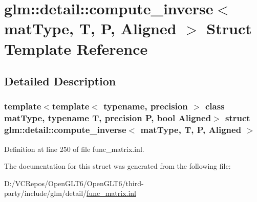 \hypertarget{structglm_1_1detail_1_1compute__inverse}{}\section{glm\+::detail\+::compute\+\_\+inverse$<$ mat\+Type, T, P, Aligned $>$ Struct Template Reference}
\label{structglm_1_1detail_1_1compute__inverse}


\subsection{Detailed Description}
\subsubsection*{template$<$template$<$ typename, precision $>$ class mat\+Type, typename T, precision P, bool Aligned$>$\newline
struct glm\+::detail\+::compute\+\_\+inverse$<$ mat\+Type, T, P, Aligned $>$}



Definition at line 250 of file func\+\_\+matrix.\+inl.



The documentation for this struct was generated from the following file\+:\begin{DoxyCompactItemize}
\item 
D\+:/\+V\+C\+Repos/\+Open\+G\+L\+T6/\+Open\+G\+L\+T6/third-\/party/include/glm/detail/\mbox{\hyperlink{func__matrix_8inl}{func\+\_\+matrix.\+inl}}\end{DoxyCompactItemize}

